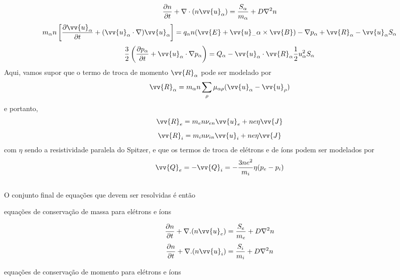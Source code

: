 \documentclass[12pt,oneside,a4paper]{abntex2}
\theoremstyle{definition}  %
\begin{document}
\begin{equation}
\frac{\partial n}{\partial t} + \nabla \cdot (n \vv{u}_\alpha) = \frac{S_\alpha}{m_\alpha}+D\nabla^2 n
\end{equation}
\begin{equation}
m_\alpha n \left[ \frac{\partial \vv{u}_\alpha}{\partial t} + (\vv{u}_\alpha \cdot \nabla)\vv{u}_\alpha \right] =  q_\alpha n (\vv{E}+\vv{u}_-\alpha \times \vv{B}) - \nabla p_\alpha + \vv{R}_\alpha - \vv{u}_\alpha S_\alpha 
\end{equation}
\begin{equation} 
\frac{3}{2} \left( \frac{\partial p_\alpha}{\partial t} + \vv{u}_\alpha \cdot \nabla p_\alpha \right) =Q_\alpha -\vv{u}_\alpha \cdot \vv{R}_\alpha \frac{1}{2} u^2_\alpha S_\alpha
\end{equation}
Aqui, vamos supor que o termo de troca de momento $\vv{R}_\alpha$ pode ser modelado por
\begin{equation}
\vv{R}_\alpha = m_\alpha n \sum_\rho  \mu_{\alpha \rho}(\vv{u}_\alpha - \vv{u}_\rho)
\end{equation}
e portanto,
\begin{equation}
\vv{R}_e = m_e n \nu_{en}\vv{u}_e+ne\eta \vv{J}
\end{equation}
\begin{equation}
\vv{R}_i = m_i n \nu_{in}\vv{u}_i+ne\eta \vv{J}
\end{equation}
com $\eta$ sendo a resistividade paralela do Spitzer, e que os termos de troca de elétrons e de íons podem ser modelados por
\begin{equation}
\vv{Q}_e = -\vv{Q}_i = -\frac{3ne^2}{m_i} \eta (p_e-p_i)
\end{equation}
\\
O conjunto final de equações que devem ser resolvidas é então\\
\begin{center}
{\large equações de conservação de massa para elétrons e íons}
\end{center}
\begin{equation}
\label{eq: pit1}
\frac{\partial n}{\partial t} + \nabla.(n \vv{u}_e) = \frac{S_e}{m_e}+D\nabla^2 n
\end{equation}
\begin{equation} 
\label{eq: pit2}
\frac{\partial n}{\partial t} + \nabla.(n \vv{u}_i) = \frac{S_i}{m_i}+D\nabla^2 n
\end{equation}
\begin{flushleft}
\begin{center}
{\large equações de conservação de momento para elétrons e íons}
\end{center}
\end{flushleft}
\end{document}
